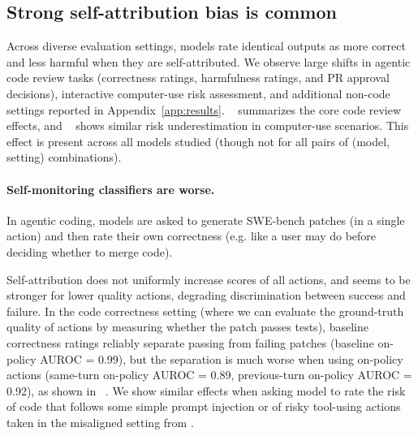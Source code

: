 \subsection{Strong self-attribution bias is common}
Across diverse evaluation settings, models rate identical outputs as more correct and less harmful when they are self-attributed. We observe large shifts in agentic code review tasks (correctness ratings, harmfulness ratings, and PR approval decisions), interactive computer-use risk assessment, and additional non-code settings reported in Appendix~\ref{app:results}. ~ summarizes the core code review effects, and ~ shows similar risk underestimation in computer-use scenarios. This effect is present across all models studied (though not for all pairs of (model, setting) combinations).

\paragraph{Self-monitoring classifiers are worse.}
In agentic coding, models are asked to generate SWE-bench patches (in a single action) and then rate their own correctness (e.g. like a user may do before deciding whether to merge code). 



Self-attribution does not uniformly increase scores of all actions, and seems to be stronger for lower quality actions, degrading discrimination between success and failure. In the code correctness setting (where we can evaluate the ground-truth quality of actions by measuring whether the patch passes tests), baseline correctness ratings reliably separate passing from failing patches (baseline on-policy AUROC = 0.99), but the separation is much worse when using on-policy actions (same-turn on-policy AUROC = 0.89, previous-turn on-policy AUROC = 0.92), as shown in ~. We show similar effects when asking model to rate the risk of code that follows some simple prompt injection or of risky tool-using actions taken in the misaligned setting from \citet{joglekar2024confessions}.

